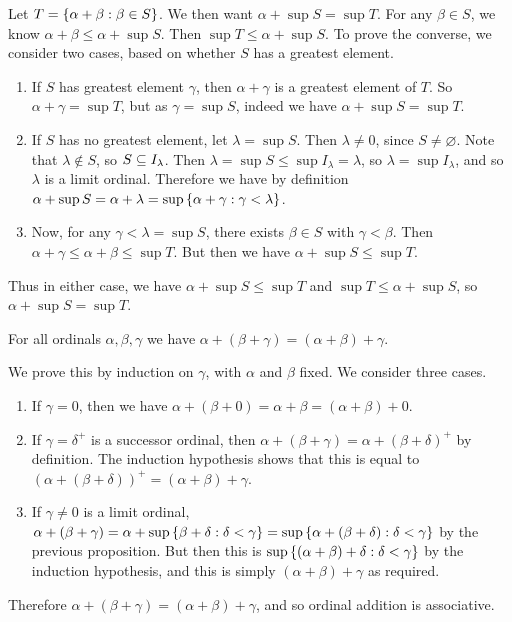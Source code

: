 \documentclass{article}
\begin{document}
\begin{prf}
	Let $T = \left\lbrace \alpha + \beta : \beta \in S \right\rbrace$. We then want $\alpha + \sup S = \sup T$. For any $\beta \in S$, we know $\alpha + \beta \leq \alpha + \sup S$. Then $\sup T \leq \alpha + \sup S$. To prove the converse, we consider two cases, based on whether $S$ has a greatest element.
	\begin{enumerate}
    	\item If $S$ has greatest element $\gamma$, then $\alpha + \gamma$ is a greatest element of $T$. So $\alpha + \gamma = \sup T$, but as $\gamma = \sup S$, indeed we have $\alpha + \sup S = \sup T$.
    	\item If $S$ has no greatest element, let $\lambda = \sup S$. Then $\lambda \neq 0$, since $S \neq \varnothing$. Note that $\lambda \notin S$, so $S \subseteq I_\lambda$. Then $\lambda = \sup S \leq \sup I_\lambda = \lambda$, so $\lambda = \sup I_\lambda$, and so $\lambda$ is a limit ordinal. Therefore we have by definition $\alpha + \sup S = \alpha + \lambda = \sup \left\lbrace \alpha + \gamma : \gamma < \lambda \right\rbrace$.
    	\item[] Now, for any $\gamma < \lambda = \sup S$, there exists $\beta \in S$ with $\gamma < \beta$. Then $\alpha + \gamma \leq \alpha + \beta \leq \sup T$. But then we have $\alpha + \sup S \leq \sup T$.
	\end{enumerate}
	Thus in either case, we have $\alpha + \sup S \leq \sup T$ and $\sup T \leq \alpha + \sup S$, so $\alpha + \sup S = \sup T$.
\end{prf}

\begin{proposition}
	\label{ordinal-addition-associative}
    For all ordinals $\alpha, \beta, \gamma$ we have $\alpha + (\beta + \gamma) = (\alpha + \beta) + \gamma$.
\end{proposition}

\begin{prf}
    We prove this by induction on $\gamma$, with $\alpha$ and $\beta$ fixed. We consider three cases.
    \begin{enumerate}
    	\item If $\gamma = 0$, then we have $\alpha + (\beta + 0) = \alpha + \beta = (\alpha + \beta) + 0$.
    	\item If $\gamma = \delta^+$ is a successor ordinal, then $\alpha + (\beta + \gamma) = \alpha + (\beta + \delta)^+$ by definition. The induction hypothesis shows that this is equal to $(\alpha + (\beta + \delta))^+ = (\alpha + \beta) + \gamma$.
    	\item If $\gamma \neq 0$ is a limit ordinal, $\alpha + (\beta + \gamma) = \alpha + \sup \left\lbrace \beta + \delta : \delta < \gamma \right\rbrace = \sup \left\lbrace \alpha + (\beta + \delta) : \delta < \gamma \right\rbrace$ by the previous proposition. But then this is $\sup \left\lbrace (\alpha + \beta) + \delta : \delta < \gamma \right\rbrace$ by the induction hypothesis, and this is simply $(\alpha + \beta) + \gamma$ as required.
	\end{enumerate}
	Therefore $\alpha + (\beta + \gamma) = (\alpha + \beta) + \gamma$, and so ordinal addition is associative.
\end{prf}
\end{document}
